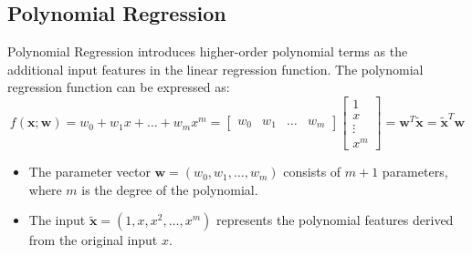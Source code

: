 \documentclass[twoside]{article}
\numberwithin{equation}{section}
\begin{document}
	\subsection{Polynomial Regression}
	\label{subsec:PolynomialRegression}
	Polynomial Regression introduces higher-order polynomial terms as the additional input features in the linear regression function. The polynomial regression function can be expressed as:
	\begin{equation}
		\boxed{f(\mathbf{x}; \mathbf{w}) = w_0 + w_1 x + \ldots + w_m x^m = \begin{bmatrix} w_0 & w_1 & \ldots & w_m \end{bmatrix} \begin{bmatrix} 1 \\ x \\ \vdots \\ x^m \end{bmatrix} = \mathbf{w}^T \mathbf{\tilde{x}} = \mathbf{\tilde{x}}^T \mathbf{w}}
	\end{equation}
	\begin{itemize}
		\item The parameter vector $\mathbf{w} = (w_0, w_1, \ldots, w_m)$ consists of $m + 1$ parameters, where $m$ is the degree of the polynomial. 
		\item The input $\mathbf{\tilde{x}} = (1, x, x^2, \ldots, x^m)$ represents the polynomial features derived from the original input $x$.
	\end{itemize}
\end{document}
